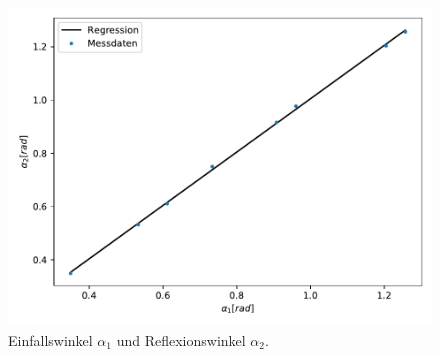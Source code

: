\begin{figure}[H]
  \centering
  \includegraphics[scale= 0.7]{auswertung/plot1.pdf}
  \caption{Einfallswinkel $\alpha_1$ und Reflexionswinkel $\alpha_2$.}
  \label{fig:plot1}
\end{figure}

